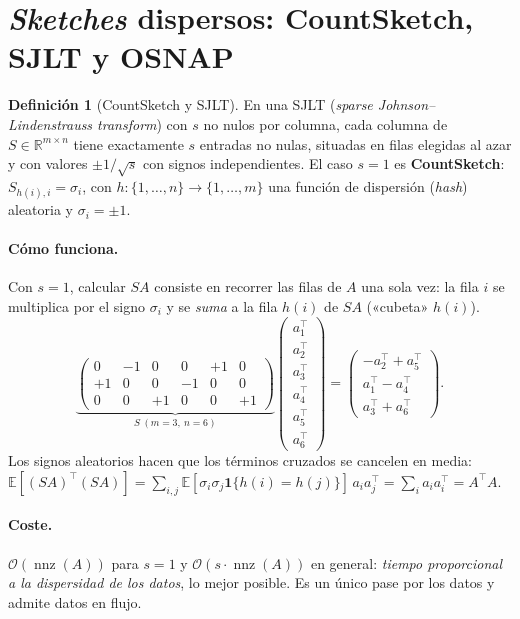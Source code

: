 \documentclass[11pt,a4paper,oneside]{book}
\theoremstyle{definition}
\newtheorem{definicion}[teorema]{Definición}
\theoremstyle{remark}
\newcommand{\R}{\mathbb{R}}
\newcommand{\E}{\mathbb{E}}
\newcommand{\cO}{\mathcal{O}}
\newcommand{\T}{^{\top}}
\DeclareMathOperator{\nnz}{nnz}
\begin{document}
\section{\emph{Sketches} dispersos: CountSketch, SJLT y OSNAP}

\begin{definicion}[CountSketch y SJLT]\label{def:countsketch}
En una SJLT (\emph{sparse Johnson--Lindenstrauss transform}) con $s$ no nulos por columna, cada columna de
$S\in\R^{m\times n}$ tiene exactamente $s$ entradas no nulas, situadas en filas elegidas al azar y con valores
$\pm1/\sqrt s$ con signos independientes. El caso $s=1$ es \textbf{CountSketch}: $S_{h(i),i}=\sigma_i$, con
$h:\{1,\dots,n\}\to\{1,\dots,m\}$ una función de dispersión (\emph{hash}) aleatoria y $\sigma_i=\pm1$.
\end{definicion}

\paragraph{Cómo funciona.} Con $s=1$, calcular $SA$ consiste en recorrer las filas de $A$ una sola vez: la fila
$i$ se multiplica por el signo $\sigma_i$ y se \emph{suma} a la fila $h(i)$ de $SA$ («cubeta» $h(i)$).
\[ \underbrace{\begin{pmatrix}0&-1&0&0&+1&0\\+1&0&0&-1&0&0\\0&0&+1&0&0&+1\end{pmatrix}}_{S\ (m=3,\ n=6)}
   \begin{pmatrix}a_1\T\\a_2\T\\a_3\T\\a_4\T\\a_5\T\\a_6\T\end{pmatrix}
   =\begin{pmatrix}-a_2\T+a_5\T\\ a_1\T-a_4\T\\ a_3\T+a_6\T\end{pmatrix}. \]
Los signos aleatorios hacen que los términos cruzados se cancelen en media:
$\E[(SA)\T(SA)]=\sum_{i,j}\E[\sigma_i\sigma_j\mathbf 1\{h(i)=h(j)\}]\,a_ia_j\T=\sum_ia_ia_i\T=A\T A$.

\paragraph{Coste.} $\cO(\nnz(A))$ para $s=1$ y $\cO(s\cdot\nnz(A))$ en general: \emph{tiempo proporcional a la
dispersidad de los datos}, lo mejor posible. Es un único pase por los datos y admite datos en flujo.
\end{document}
